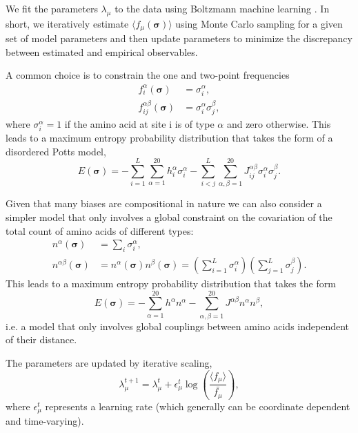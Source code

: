 \documentclass[superscriptaddress,twocolumn,pre]{revtex4}
\newcommand{\B}{\boldsymbol}
\newcommand{\<}{\langle}
\renewcommand{\>}{\rangle}
\begin{document}
We fit the parameters $\lambda_\mu$ to the data using Boltzmann machine learning \cite{Ackley1985}. In short, we iteratively estimate $\langle f_\mu(\B \sigma)\rangle$ using Monte Carlo sampling for a given set of model parameters and then update parameters to minimize the discrepancy between estimated and empirical observables.

A common choice is to constrain the one and two-point frequencies
\begin{align}
    f_i^\alpha(\B \sigma) &= \sigma_i^\alpha, \\
    f_{ij}^{\alpha\beta}(\B \sigma) &= \sigma_i^\alpha \sigma_j^\beta,
\end{align}
where $\sigma_i^\alpha = 1$ if the amino acid at site i is of type $\alpha$ and zero otherwise.
This leads to a maximum entropy probability distribution that takes the form of a disordered Potts model,
\begin{equation}
    E(\boldsymbol \sigma) = - \sum_{i=1}^L \sum_{\alpha = 1}^{20} h_i^\alpha \sigma_i^\alpha - \sum_{i<j}^L \sum_{\alpha,\beta = 1}^{20} J_{ij}^{\alpha \beta}  \sigma_i^\alpha \sigma_j^\beta.
\end{equation}

Given that many biases are compositional in nature we can also consider a simpler model that only involves a global constraint on the covariation of the total count of amino acids of different types:
\begin{align}
    n^\alpha(\B \sigma) &= \sum_i \sigma_i^\alpha, \\
    n^{\alpha\beta}(\B \sigma) &= n^\alpha(\B \sigma) n^\beta(\B\sigma) = \left(\sum_{i=1}^L \sigma_i^\alpha\right) \left(\sum_{j=1}^L \sigma_j^\beta\right).
\end{align}
This leads to a maximum entropy probability distribution that takes the form
\begin{equation}
    E(\boldsymbol \sigma) = - \sum_{\alpha=1}^{20} h^\alpha n^\alpha -  \sum_{\alpha,\beta = 1}^{20} J^{\alpha \beta} n^\alpha n^\beta,
\end{equation}
i.e. a model that only involves global couplings between amino acids independent of their distance.


The parameters are updated by iterative scaling,
\begin{equation}
    \lambda_\mu^{t+1} = \lambda_\mu^t + \epsilon_\mu^t \log \left( \frac{\langle f_\mu \rangle}{\bar{f_\mu}} \right),
\end{equation}
where $\epsilon_\mu^t$ represents a learning rate (which generally can be coordinate dependent and time-varying).
\end{document}
